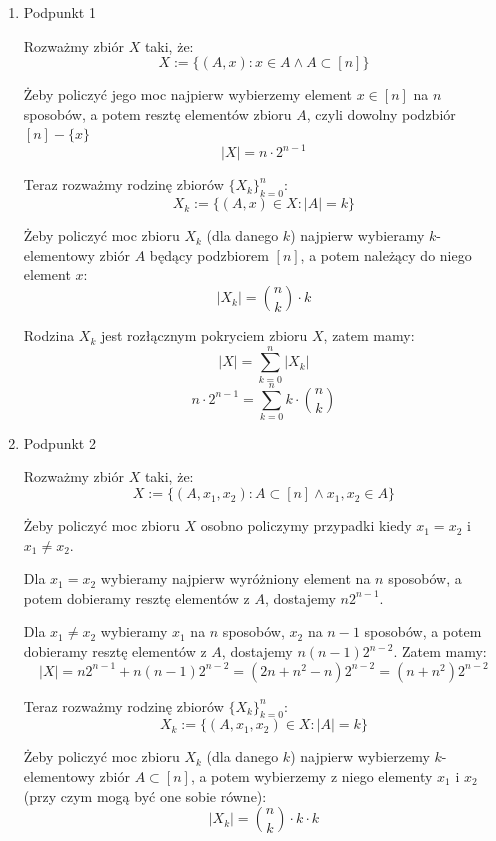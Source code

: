 \documentclass{mwart}
\begin{document}
\begin{mdframed}
    \begin{enumerate}
        \item Podpunkt 1

              Rozważmy zbiór $X$ taki, że:
              \[X := \{ (A, x) : x \in A \wedge A \subset [n]\}\]

              Żeby policzyć jego moc najpierw wybierzemy element $x \in [n]$ na $n$ sposobów,
              a potem resztę elementów zbioru $A$, czyli dowolny podzbiór $[n]-\{x\}$
              \[|X| = n \cdot 2^{n-1}\]

              Teraz rozważmy rodzinę zbiorów $\{X_k\}_{k=0}^n$:
              \[X_k := \{(A, x) \in X : |A| = k\}\]

              Żeby policzyć moc zbioru $X_k$ (dla danego $k$) najpierw wybieramy $k$-elementowy zbiór $A$ będący podzbiorem $[n]$, a potem należący
              do niego element $x$:
              \[|X_k| = {n \choose k} \cdot k\]

              Rodzina $X_k$ jest rozłącznym pokryciem zbioru $X$, zatem mamy:
              \[|X| = \sum_{k=0}^{n} |X_k|\]
              \[n \cdot 2^{n-1} = \sum_{k=0}^{n} k \cdot {n \choose k}\]

        \item Podpunkt 2

              Rozważmy zbiór $X$ taki, że:
              \[X := \{(A, x_1, x_2) : A \subset [n] \wedge x_1, x_2 \in A\}\]

              Żeby policzyć moc zbioru $X$ osobno policzymy przypadki kiedy $x_1 = x_2$ i $x_1 \neq x_2$.

              Dla $x_1 = x_2$ wybieramy najpierw wyróżniony element na $n$ sposobów, a potem dobieramy resztę elementów z $A$,
              dostajemy $n2^{n-1}$.

              Dla $x_1 \neq x_2$ wybieramy $x_1$ na $n$ sposobów, $x_2$ na $n-1$ sposobów, a potem dobieramy resztę elementów z $A$,
              dostajemy $n(n-1)2^{n-2}$.
              Zatem mamy:
              \[|X| = n2^{n-1} + n(n-1)2^{n-2} = (2n + n^2 - n)2^{n-2} = (n + n^2)2^{n-2}\]

              Teraz rozważmy rodzinę zbiorów $\{X_k\}_{k=0}^n$:
              \[X_k := \{(A, x_1, x_2) \in X : |A| = k\}\]

              Żeby policzyć moc zbioru $X_k$ (dla danego $k$) najpierw wybierzemy $k$-elementowy zbiór $A \subset [n]$, a potem wybierzemy z niego elementy
              $x_1$ i $x_2$ (przy czym mogą być one sobie równe):
              \[|X_k| = {n \choose k} \cdot k\cdot k\]


\end{enumerate}
\end{mdframed}
\end{document}
